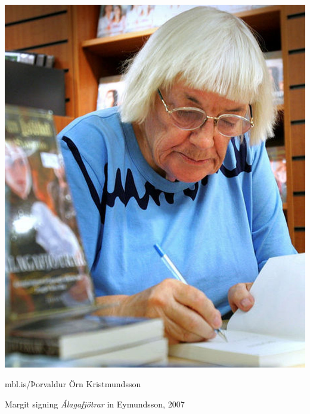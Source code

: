 \begin{frame}
\begin{columns}[T]
\begin{column}{0.4\textwidth}
            \includegraphics[width=\textwidth]{../figures/margit_sandemo}
            \begin{tiny}
                mbl.is/Þorvaldur Örn Kristmundsson
            \end{tiny}

            \vfill
            Margit signing \emph{Álagafjötrar} in Eymundsson, 2007
        \end{column}
    \end{columns}
\end{frame}


